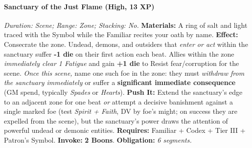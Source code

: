 \paragraph{Sanctuary of the Just Flame (High, 13 XP)} \emph{Duration: Scene; Range: Zone; Stacking: No.}  
\textbf{Materials:} A ring of salt and light traced with the Symbol while the Familiar recites your oath by name.  
\textbf{Effect:} Consecrate the zone. Undead, demons, and outsiders that \emph{enter or act} within the sanctuary suffer \textbf{-1 die} on their first action each beat. Allies within the zone \emph{immediately clear 1 Fatigue} and gain \textbf{+1 die} to Resist fear/corruption for the scene. \emph{Once this scene,} name one such foe in the zone: they must \emph{withdraw from the sanctuary immediately} or suffer a \textbf{significant immediate consequence} (GM spend, typically \emph{Spades} or \emph{Hearts}).  
\textbf{Push It:} Extend the sanctuary's edge to an adjacent zone for one beat \emph{or} attempt a decisive banishment against a single marked foe (test \emph{Spirit + Faith}, DV by foe's might; on success they are expelled from the scene), but the sanctuary's power draws the attention of powerful undead or demonic entities.
\textbf{Requires:} Familiar + Codex + Tier III + Patron's Symbol. \;\; \textbf{Invoke:} \textbf{2 Boons}. \;\; \textbf{Obligation:} \emph{6 segments.}

